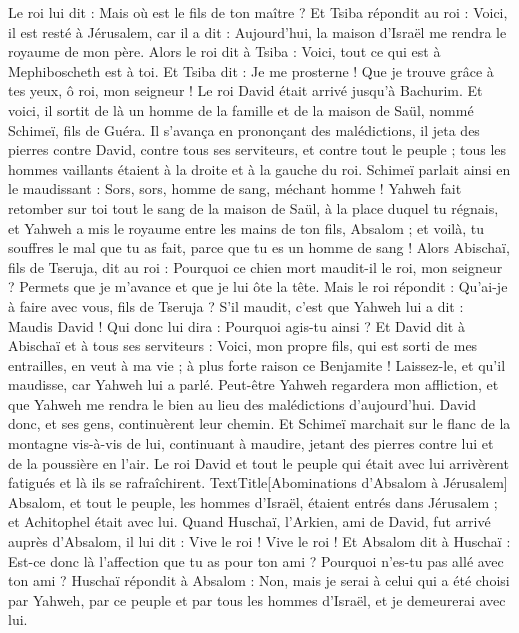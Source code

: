 \begin{multicols}{2}
Le roi lui dit : Mais où est le fils de ton maître ? Et Tsiba répondit au roi : Voici, il est resté à Jérusalem, car il a dit : Aujourd'hui, la maison d'Israël me rendra le royaume de mon père.
Alors le roi dit à Tsiba : Voici, tout ce qui est à Mephiboscheth est à toi. Et Tsiba dit : Je me prosterne ! Que je trouve grâce à tes yeux, ô roi, mon seigneur !
Le roi David était arrivé jusqu'à Bachurim. Et voici, il sortit de là un homme de la famille et de la maison de Saül, nommé Schimeï, fils de Guéra. Il s’avança en prononçant des malédictions,
il jeta des pierres contre David, contre tous ses serviteurs, et contre tout le peuple ; tous les hommes vaillants étaient à la droite et à la gauche du roi.
Schimeï parlait ainsi en le maudissant : Sors, sors, homme de sang, méchant homme !
Yahweh fait retomber sur toi tout le sang de la maison de Saül, à la place duquel tu régnais, et Yahweh a mis le royaume entre les mains de ton fils, Absalom ; et voilà, tu souffres le mal que tu as fait, parce que tu es un homme de sang !
Alors Abischaï, fils de Tseruja, dit au roi : Pourquoi ce chien mort maudit-il le roi, mon seigneur ? Permets que je m’avance et que je lui ôte la tête.
Mais le roi répondit : Qu'ai-je à faire avec vous, fils de Tseruja ? S’il maudit, c’est que Yahweh lui a dit : Maudis David ! Qui donc lui dira : Pourquoi agis-tu ainsi ?
Et David dit à Abischaï et à tous ses serviteurs : Voici, mon propre fils, qui est sorti de mes entrailles, en veut à ma vie ; à plus forte raison ce Benjamite ! Laissez-le, et qu'il maudisse, car Yahweh lui a parlé.
Peut-être Yahweh regardera mon affliction, et que Yahweh me rendra le bien au lieu des malédictions d’aujourd'hui.
David donc, et ses gens, continuèrent leur chemin. Et Schimeï marchait sur le flanc de la montagne vis-à-vis de lui, continuant à maudire, jetant des pierres contre lui et de la poussière en l’air.
Le roi David et tout le peuple qui était avec lui arrivèrent fatigués et là ils se rafraîchirent.
TextTitle{[Abominations d'Absalom à Jérusalem]}
Absalom, et tout le peuple, les hommes d'Israël, étaient entrés dans Jérusalem ; et Achitophel était avec lui.
Quand Huschaï, l’Arkien, ami de David, fut arrivé auprès d’Absalom, il lui dit : Vive le roi ! Vive le roi !
Et Absalom dit à Huschaï : Est-ce donc là l'affection que tu as pour ton ami ? Pourquoi n'es-tu pas allé avec ton ami ?
Huschaï répondit à Absalom : Non, mais je serai à celui qui a été choisi par Yahweh, par ce peuple et par tous les hommes d'Israël, et je demeurerai avec lui.

\end{multicols}
